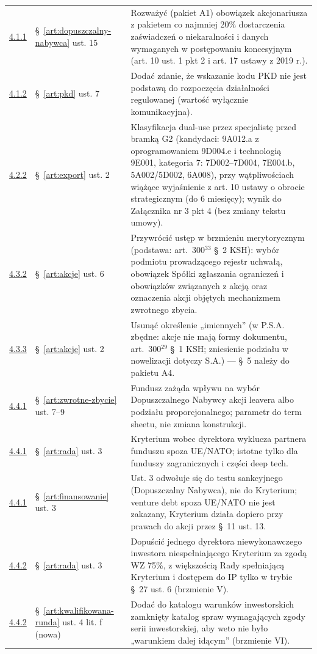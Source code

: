 \documentclass[12pt,a4paper]{report}
\begin{document}
\begin{longtable}{@{}p{1.3cm} p{3.3cm} p{9.6cm}@{}}
\hyperref[memo:4.1.1]{4.1.1} & §~\ref{art:dopuszczalny-nabywca} ust. 15 & Rozważyć (pakiet A1) obowiązek akcjonariusza z pakietem co najmniej 20\% dostarczenia zaświadczeń o niekaralności i danych wymaganych w postępowaniu koncesyjnym (art. 10 ust. 1 pkt 2 i art. 17 ustawy z 2019 r.). \\
\hyperref[memo:4.1.2]{4.1.2} & §~\ref{art:pkd} ust. 7 & Dodać zdanie, że wskazanie kodu PKD nie jest podstawą do rozpoczęcia działalności regulowanej (wartość wyłącznie komunikacyjna). \\
\hyperref[memo:4.2.2]{4.2.2} & §~\ref{art:export} ust. 2 & Klasyfikacja dual-use przez specjalistę przed bramką G2 (kandydaci: 9A012.a z oprogramowaniem 9D004.e i technologią 9E001, kategoria 7: 7D002--7D004, 7E004.b, 5A002/5D002, 6A008), przy wątpliwościach wiążące wyjaśnienie z art. 10 ustawy o obrocie strategicznym (do 6 miesięcy); wynik do Załącznika nr 3 pkt 4 (bez zmiany tekstu umowy). \\
\hyperref[memo:4.3.2]{4.3.2} & §~\ref{art:akcje} ust. 6 & Przywrócić ustęp w brzmieniu merytorycznym (podstawa: art.~300$^{33}$ §~2 KSH): wybór podmiotu prowadzącego rejestr uchwałą, obowiązek Spółki zgłaszania ograniczeń i obowiązków związanych z akcją oraz oznaczenia akcji objętych mechanizmem zwrotnego zbycia. \\
\hyperref[memo:4.3.3]{4.3.3} & §~\ref{art:akcje} ust. 2 & Usunąć określenie „imiennych” (w P.S.A. zbędne: akcje nie mają formy dokumentu, art.~300$^{29}$ §~1 KSH; zniesienie podziału w nowelizacji dotyczy S.A.) --- §~5 należy do pakietu A4. \\
\hyperref[memo:4.4.1]{4.4.1} & §~\ref{art:zwrotne-zbycie} ust. 7--9 & Fundusz zażąda wpływu na wybór Dopuszczalnego Nabywcy akcji leavera albo podziału proporcjonalnego; parametr do term sheetu, nie zmiana konstrukcji. \\
\hyperref[memo:4.4.1]{4.4.1} & §~\ref{art:rada} ust. 3 & Kryterium wobec dyrektora wyklucza partnera funduszu spoza UE/NATO; istotne tylko dla funduszy zagranicznych i części deep tech. \\
\hyperref[memo:4.4.1]{4.4.1} & §~\ref{art:finansowanie} ust. 3 & Ust. 3 odwołuje się do testu sankcyjnego (Dopuszczalny Nabywca), nie do Kryterium; venture debt spoza UE/NATO nie jest zakazany, Kryterium działa dopiero przy prawach do akcji przez §~11 ust. 13. \\
\hyperref[memo:4.4.2]{4.4.2} & §~\ref{art:rada} ust. 3 & Dopuścić jednego dyrektora niewykonawczego inwestora niespełniającego Kryterium za zgodą WZ 75\%, z większością Rady spełniającą Kryterium i dostępem do IP tylko w trybie §~27 ust. 6 (brzmienie V). \\
\hyperref[memo:4.4.2]{4.4.2} & §~\ref{art:kwalifikowana-runda} ust. 4 lit. f (nowa) & Dodać do katalogu warunków inwestorskich zamknięty katalog spraw wymagających zgody serii inwestorskiej, aby weto nie było „warunkiem dalej idącym” (brzmienie VI). \\
\bottomrule
\end{longtable}
\end{document}
